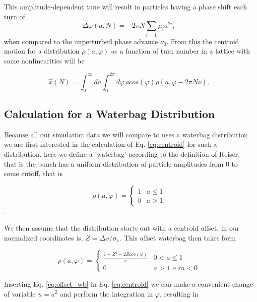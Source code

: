 \documentclass[aps,prstab,twocolumn, groupedaddress]{revtex4-1}
\begin{document}
This amplitude-dependent tune will result in particles having a phase shift each turn of
\begin{equation}
\Delta \varphi(a, N) = -2 \pi N \sum_{i=1} \mu_i a^{2i},
\end{equation}
when compared to the unperturbed phase advance $\nu_0$. From this the centroid 
motion for a distribution $\rho(a, \varphi)$ as a function of turn number in a lattice with 
some nonlinearities will be

\begin{equation} \label{eq:centroid}
\hat{x}(N) = \int_{0}^{\infty}da \int_{0}^{2\pi}d\varphi \, a cos(\varphi) \rho(a,
\varphi -
2\pi N \nu).
\end{equation}

\subsection{Calculation for a Waterbag Distribution}

Because all our simulation data we will compare to uses a waterbag distribution we are 
first interested in the calculation of Eq. \ref{eq:centroid} for such a distribution. here we 
define a 'waterbag' according to the definition of Reiser, that is the bunch has a uniform 
distribution of particle amplitudes from 0 to some cutoff, that is

\begin{equation} \label{eq:waterbag}
\rho(a, \varphi) =
\left\{
\begin{array}{lr}
1 &  a \leq 1 \\
0 &  a > 1
\end{array}
\right.
\end{equation}. 

We then assume that the distribution starts out with a centroid offset, in our normalized 
coordinates is, $Z = \Delta x / \sigma_x$. This offset waterbag then takes form

\begin{equation} \label{eq:offset_wb}
\rho(a, \varphi) =
\left\{
\begin{array}{lr}
\frac{1 + Z^2 - 2Zcos(\varphi)}{\pi} &  0 < a \leq 1 \\
0 &  a > 1 \, \,o \, \,r a < 0
\end{array}
\right.
\end{equation}

Inserting Eq. \ref{eq:offset_wb} in Eq. \ref{eq:centroid} we can make a convenient change 
of variable $u=a^2$ and perform the integration in $\varphi$, resulting in
\end{document}
